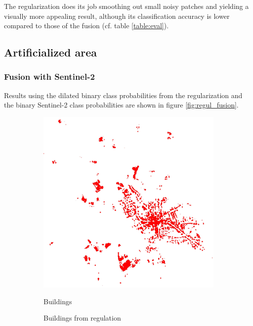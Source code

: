 \documentclass[10pt]{article}
\begin{document}
The regularization does its job smoothing out small noisy patches and yielding a visually more appealing result, although its classification accuracy is lower compared to those of the fusion (cf. table \ref{table:eval}).

\subsection{Artificialized area}
\subsubsection{Fusion with Sentinel-2}
Results using the dilated binary class probabilities from the regularization and the binary Sentinel-2 class probabilities are shown in figure \ref{fig:regul_fusion}.
\begin{figure}[H]
    \centering
    \begin{subfigure}{0.49\textwidth}
        \centering
        \includegraphics[width=.9\textwidth]{binary_1_bati}
        \caption{Buildings from regulation}
        {\vspace{3mm}
            \small\centering
            \quad Buildings
        }
    \end{subfigure}
    \begin{subfigure}{0.49\textwidth}
        \centering

\end{subfigure}
\end{figure}
\end{document}
